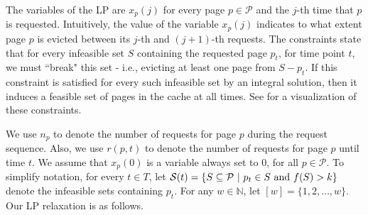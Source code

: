 \documentclass[11pt]{article}
\newcommand{\cC}{{\mathcal{C}}}
\newcommand{\cP}{{\mathcal{P}}}
\newcommand{\cS}{{\mathcal{S}}}
\newcommand{\om}{{\Omega}}
\begin{document}
The variables of the LP are $x_{p}(j)$ for every page $p \in \cP$ and the $j$-th time that $p$ is requested.  Intuitively, the value of the variable $x_{p}(j)$ indicates to what extent page $p$ is evicted between its $j$-th and $(j+1)$-th requests.  %
The constraints state that for every infeasible set $S$ containing the requested page $p_t$, for time point $t$, we must ``break" this set - i.e., evicting at least one page from $S - p_t$. If this constraint is satisfied for every such infeasible set by an integral solution, then it induces a feasible set of pages in the cache at all times. See  for a visualization of these constraints. %

We use $n_p$ to denote the number of requests for page $p$ during the request sequence. %
Also, %
we use $r(p,t)$ to denote the number of requests for page $p$ until time $t$. We assume that $x_p(0)$ is a variable always set to $0$, for all $p \in \cP$. To simplify notation, for every $t \in T$, let $\cS(t) = \left\{ S \subseteq \cP ~|~  p_t \in S \textnormal{ and } f(S)>k \right\}$ denote the infeasible sets containing $p_t$. For any $w \in \mathbb{N}$, let $[w] = \{1,2,\ldots,w\}$. Our LP relaxation is as follows. 
\end{document}
